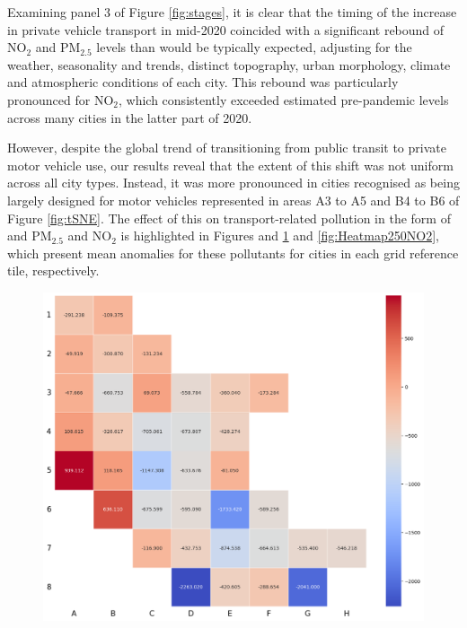 \documentclass[preprint,12pt]{elsarticle}
\begin{document}
Examining panel 3 of Figure \ref{fig:stages}, it is clear that the timing of the increase in private vehicle transport in mid-2020 coincided with a significant rebound of NO$_{2}$ and PM$_{2.5}$ levels than would be typically expected, adjusting for the weather, seasonality and trends, distinct topography, urban morphology, climate and atmospheric conditions of each city\cite{Wijnands2022}. This rebound was particularly pronounced for NO$_{2}$, which consistently exceeded estimated pre-pandemic levels across many cities in the latter part of 2020.

However, despite the global trend of transitioning from public transit to private motor vehicle use\cite{fernando2023shaping}, our results reveal that the extent of this shift was not uniform across all city types. Instead, it was more pronounced in cities recognised as being largely designed for motor vehicles\cite{Thompson2020} represented in areas A3 to A5 and B4 to B6 of Figure \ref{fig:tSNE}. The effect of this on transport-related pollution in the form of and PM$_{2.5}$ and NO$_{2}$ is highlighted in Figures  and \ref{fig:Heatmap250PM} and \ref{fig:Heatmap250NO2}, which present mean anomalies for these pollutants for cities in each grid reference tile, respectively.

\begin{figure}
\centering
\includegraphics[trim={0 0 0 0},clip,scale=0.45]{Images/heatmap_pm25Anomaly250.png}
\caption{\bf }  
 \label{fig:Heatmap250PM}
\end{figure}
\end{document}
